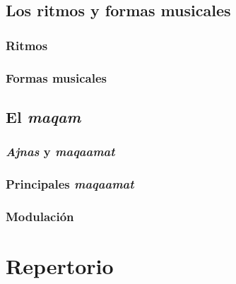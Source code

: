 	\chapter{Los ritmos y formas musicales}
		\section{Ritmos}
		\section{Formas musicales}
	\chapter{El \emph{maqam}}
		\section{\emph{Ajnas} y \emph{maqaamat}}
		\section{Principales \emph{maqaamat}}
		\section{Modulación}
\part{Repertorio}
